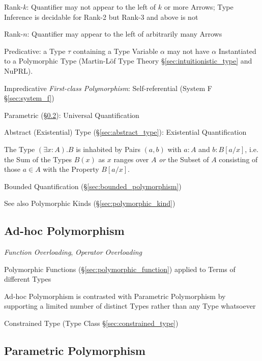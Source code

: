 Rank-$k$: Quantifier may not appear to the left of $k$ or more Arrows;
Type Inference is decidable for Rank-2 but Rank-3 and above is not

Rank-$n$: Quantifier may appear to the left of arbitrarily many Arrows

Predicative: a Type $\tau$ containing a Type Variable $\alpha$ may not
have $\alpha$ Instantiated to a Polymorphic Type (Martin-L\"of Type
Theory \S\ref{sec:intuitionistic_type} and NuPRL).

Impredicative \emph{First-class Polymorphism}: Self-referential
(System F \S\ref{sec:system_f})

Parametric (\S\ref{sec:parametric_polymorphism}): Universal
Quantification

Abstract (Existential) Type (\S\ref{sec:abstract_type}): Existential
Quantification

The Type $(\exists x : A).B$ is inhabited by Pairs $(a,b)$ with $a:A$
and $b:B[a/x]$, i.e. the Sum of the Types $B(x)$ as $x$ ranges over
$A$ \emph{or} the Subset of $A$ consisting of those $a \in A$ with the
Property $B[a/x]$.

Bounded Quantification (\S\ref{sec:bounded_polymorphism})

\fist See also Polymorphic Kinds (\S\ref{sec:polymorphic_kind})



\subsection{Ad-hoc Polymorphism}\label{sec:adhoc_polymorphism}

\emph{Function Overloading}, \emph{Operator Overloading}

Polymorphic Functions (\S\ref{sec:polymorphic_function}) applied to
Terms of different Types

Ad-hoc Polymorphism is contrasted with Parametric Polymorphism by
supporting a limited number of distinct Types rather than any Type
whatsoever

Constrained Type (Type Class \S\ref{sec:constrained_type})



\subsection{Parametric Polymorphism}\label{sec:parametric_polymorphism}

